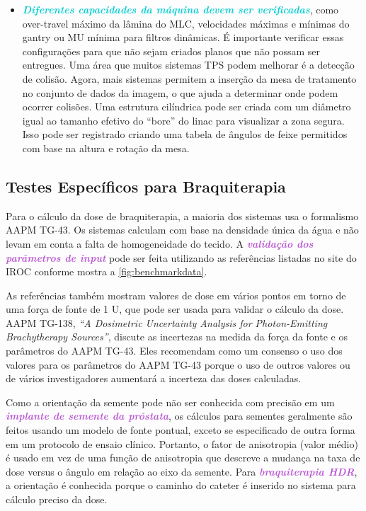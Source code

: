 \documentclass[11pt,a4paper]{article}
\begin{document}
\begin{itemize}[label=\textcolor{CarnationPink}{$\star$}]
		\item \textcolor{DarkTurquoise}{\textbf{\textit{Diferentes capacidades da máquina devem ser verificadas}}}, como over-travel máximo da lâmina do MLC, velocidades máximas e mínimas do gantry ou MU mínima para filtros dinâmicas. É importante verificar essas configurações para que não sejam criados planos que não possam ser entregues. Uma área que muitos sistemas TPS podem melhorar é a detecção de colisão. Agora, mais sistemas permitem a inserção da mesa de tratamento no conjunto de dados da imagem, o que ajuda a determinar onde podem ocorrer colisões. Uma estrutura cilíndrica pode ser criada com um diâmetro igual ao tamanho efetivo do “bore” do linac para visualizar a zona segura. Isso pode ser registrado criando uma tabela de ângulos de feixe permitidos com base na altura e rotação da mesa.
	
	\end{itemize}

\subsection*{Testes Específicos para Braquiterapia}

	Para o cálculo da dose de braquiterapia, a maioria dos sistemas usa o formalismo AAPM TG-43. Os sistemas calculam com base na densidade única da água e não levam em conta a falta de homogeneidade do tecido. A \textcolor{MediumOrchid}{\textbf{\textit{validação dos parâmetros de input}}} pode ser feita utilizando as referências listadas no site do IROC conforme mostra a \ref{fig:benchmarkdata}. 
	
	As referências também mostram valores de dose em vários pontos em torno de uma força de fonte de 1 U, que pode ser usada para validar o cálculo da dose. AAPM TG-138, \textit{``A Dosimetric Uncertainty Analysis for Photon-Emitting Brachytherapy Sources''}, discute as incertezas na medida da força da fonte e os parâmetros do AAPM TG-43. Eles recomendam como um consenso o uso dos valores para os parâmetros do AAPM TG-43 porque o uso de outros valores ou de vários investigadores aumentará a incerteza das doses calculadas.

	Como a orientação da semente pode não ser conhecida com precisão em um \textcolor{MediumOrchid}{\textbf{\textit{implante de semente da próstata}}}, os cálculos para sementes geralmente são feitos usando um modelo de fonte pontual, exceto se especificado de outra forma em um protocolo de ensaio clínico. Portanto, o fator de anisotropia (valor médio) é usado em vez de uma função de anisotropia que descreve a mudança na taxa de dose versus o ângulo em relação ao eixo da semente. Para \textcolor{MediumOrchid}{\textbf{\textit{braquiterapia HDR}}}, a orientação é conhecida porque o caminho do cateter é inserido no sistema para cálculo preciso da dose.
	
\end{document}
